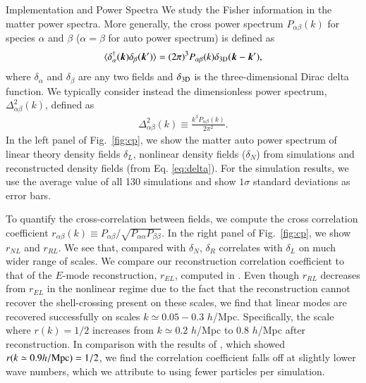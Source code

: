 \begin{section}{Implementation and Power Spectra}
 We study the Fisher information in the matter power
 spectra. More generally,
 the cross power spectrum $P_{\alpha\beta}(k)$ for species $\alpha$ and $\beta$
 ($\alpha=\beta$ for auto power spectrum) is defined as
 \begin{align}
   \langle \delta_\alpha^\dagger(\bm{k})\delta_\beta(\bm{k}') \rangle =
   (2\pi)^3 P_{\alpha\beta}(k) \delta_{\rm {3D}}(\bm{k}-\bm{k}'),
 \end{align}
 where $\delta_{\alpha}$ and $\delta_{\beta}$ are any two fields and
 $\delta_{\rm{3D}}$ is the three-dimensional Dirac delta function. We typically consider instead
 the dimensionless power spectrum, $\Delta_{\alpha\beta}^2(k)$, defined as
 \begin{align}
   \Delta_{\alpha\beta}^2(k) \equiv \frac{k^3 P_{\alpha\beta}(k)}{2\pi ^2}.
 \end{align}
 In the left panel of Fig.~\ref{fig:cp}, we show the matter auto power
 spectrum of linear theory density fields $\delta_L$, nonlinear density
 fields ($\delta_N$) from simulations and reconstructed density fields
 (from Eq. \ref{eq:delta}).  For the simulation
 results, we use the average value of all 130 simulations and show
 $1\sigma$ standard deviations as error bars.  

 To quantify the cross-correlation
 between fields, we compute the cross correlation coefficient
 $r_{\alpha\beta}(k)\equiv P_{\alpha\beta}/\sqrt{P_{\alpha\alpha}P_{\beta\beta}}$.  In the right panel of
 Fig.~\ref{fig:cp}, we show $r_{NL}$ and $r_{RL}$.  We see that, compared with $\delta_N$,
 $\delta_R$ correlates with $\delta_L$ on much wider range of scales.
 We compare our reconstruction correlation coefficient to that of the $E$-mode 
 reconstruction, $r_{EL}$, 
 computed in \citealt{bib:Yu2016}.
 Even though $r_{RL}$ decreases from $r_{EL}$ in the nonlinear regime due to the fact that the  reconstruction 
 cannot recover the shell-crossing present on these scales, we find that linear
 modes are recovered successfully on scales $k\simeq 0.05 - 0.3$ $h$/Mpc.
 Specifically, the scale where $r(k)=1/2$ increases from $k\simeq 0.2$ $h$/Mpc to
 $0.8$ $h$/Mpc after reconstruction.  In comparison with the results of \citet{bib:ZhuH2016},
 which showed $r(k\simeq0.9 h/\rm{Mpc})=1/2$, we find the correlation coefficient falls off at slightly lower
 wave numbers, which we attribute to using fewer particles per simulation.


\end{section}
